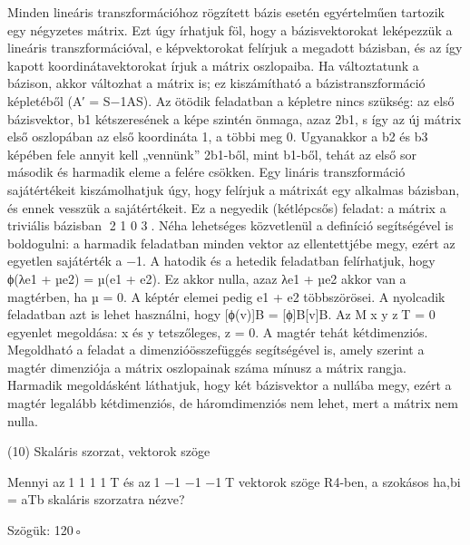 \begin{frame}
  \begin{tcolorbox}[title={9/4. -R-}]
    Minden lineáris transzformációhoz rögzített bázis esetén egyértelműen tartozik egy négyzetes mátrix. Ezt úgy írhatjuk föl, hogy a bázisvektorokat leképezzük a lineáris transzformációval, e képvektorokat felírjuk a megadott bázisban, és az így kapott koordinátavektorokat írjuk a mátrix oszlopaiba. Ha változtatunk a bázison, akkor változhat a mátrix is; ez kiszámítható a bázistranszformáció képletéből (A′ = S−1AS). Az ötödik feladatban a képletre nincs szükség: az első bázisvektor, b1 kétszeresének a képe szintén önmaga, azaz 2b1, s így az új mátrix első oszlopában az első koordináta 1, a többi meg 0. Ugyanakkor a b2 és b3 képében fele annyit kell „vennünk” 2b1-ből, mint b1-ből, tehát az első sor második és harmadik eleme a felére csökken. Egy lináris transzformáció sajátértékeit kiszámolhatjuk úgy, hogy felírjuk a mátrixát egy alkalmas bázisban, és ennek vesszük a sajátértékeit. Ez a negyedik (kétlépcsős) feladat: a mátrix a triviális bázisban 2 1 0 3. Néha lehetséges közvetlenül a deﬁníció segítségével is boldogulni: a harmadik feladatban minden vektor az ellentettjébe megy, ezért az egyetlen sajátérték a −1. A hatodik és a hetedik feladatban felírhatjuk, hogy ϕ(λe1 + µe2) = µ(e1 + e2). Ez akkor nulla, azaz λe1 + µe2 akkor van a magtérben, ha µ = 0. A képtér elemei pedig e1 + e2 többszörösei. A nyolcadik feladatban azt is lehet használni, hogy [ϕ(v)]B = [ϕ]B[v]B. Az Mx y zT = 0 egyenlet megoldása: x és y tetszőleges, z = 0. A magtér tehát kétdimenziós. Megoldható a feladat a dimenzióösszefüggés segítségével is, amely szerint a magtér dimenziója a mátrix oszlopainak száma mínusz a mátrix rangja. Harmadik megoldásként láthatjuk, hogy két bázisvektor a nullába megy, ezért a magtér legalább kétdimenziós, de háromdimenziós nem lehet, mert a mátrix nem nulla.

  \end{tcolorbox}
\end{frame}


\begin{frame}[plain]
\begin{tcolorbox}[center, colback={myyellow}, coltext={black}, colframe={myyellow}]
    {\RHuge  (10) Skaláris szorzat, vektorok szöge }
    \mmedskip
\end{tcolorbox}
\end{frame}

\begin{frame}
  \begin{tcolorbox}[title={10/1. -N-}]
    Mennyi az1 1 1 1T és az1 −1 −1 −1T vektorok szöge R4-ben, a szokásos ha,bi = aTb skaláris szorzatra nézve?

  \tcblower

    \mmedskip 
    
    Szögük: 120◦

  \end{tcolorbox}
\end{frame}


